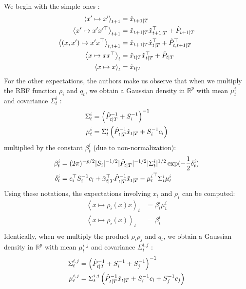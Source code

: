 We begin with the simple ones :
\begin{align*}
  \left< x' \mapsto x'\right>_{t+1} &= \hat{x}_{t+1 \mathbin{\vert} T}\\
  \left< x' \mapsto x'x'^{\top}\right>_{t+1} &= \hat{x}_{t+1 \mathbin{\vert} T}\hat{x}_{t+1 \mathbin{\vert} T}^{\top} + \hat{P}_{t+1 \mathbin{\vert} T}\\
  \left< (x,x') \mapsto x'x^{\top}\right>_{t,t+1} &= \hat{x}_{t+1 \mathbin{\vert} T} \hat{x}_{t \mathbin{\vert} T}^{\top} + \hat{P}_{t,t+1 \mathbin{\vert} T}^{\top}\\
  \left< x \mapsto xx^{\top}\right>_{t} &= \hat{x}_{t \mathbin{\vert} T} \hat{x}_{t \mathbin{\vert} T}^{\top} + \hat{P}_{t \mathbin{\vert} T}\\
  \left< x \mapsto x\right>_{t} &= \hat{x}_{t \mathbin{\vert} T}\\
\end{align*}
For the other expectations, the authors make us observe that when we multiply the RBF function $\rho_i$ and $q_t$, we obtain a Gaussian density in $\mathbb{R}^p$ with mean $\mu^i_t$ and covariance $\Sigma^i_t$ :
\begin{align*}
  \Sigma^i_t &= \left( \hat{P}_{t \mathbin{\vert} T}^{-1} + S_i^{-1} \right)^{-1}\\
  \mu^i_t &= \Sigma^i_t \left( \hat{P}_{t \mathbin{\vert} T}^{-1} \hat{x}_{t \mathbin{\vert} T} + S_i^{-1}c_i \right)\\
\end{align*}
multiplied by the constant $\beta^i_t$ (due to non-normalization):
\begin{align*}
  \beta^i_t &= (2\pi)^{-p/2} |S_i|^{-1/2} |\hat{P}_{t|T}|^{-1/2} |\Sigma^i_t|^{1/2} \exp(-\frac{1}{2} \delta^i_t)\\
  \delta^i_t &= c_i^{\top} S_i^{-1} c_i + \hat{x}_{t \mathbin{\vert} T}^{\top} \hat{P}_{t \mathbin{\vert} T}^{-1} \hat{x}_{t \mathbin{\vert} T} - {\mu^i_t}^{\top} \Sigma^i_t \mu^i_t\\
\end{align*}
Using these notations, the expectations involving $x_t$ and $\rho_i$ can be computed:
\begin{align*}
  \left< x \mapsto \rho_i(x) x \right>_{t} &= \beta^i_t \mu^i_t\\
  \left< x \mapsto \rho_i(x) \right>_{t} &= \beta^i_t\\
\end{align*}
Identically, when we multiply the product $\rho_i \rho_j$ and $q_t$, we obtain a Gaussian density in $\mathbb{R}^p$ with mean $\mu^{i,j}_t$ and covariance $\Sigma^{i,j}_t$ :
\begin{align*}
  \Sigma^{i,j}_t &= \left( \hat{P}_{t \mathbin{\vert} T}^{-1} + S_i^{-1} + S_j^{-1} \right)^{-1}\\
  \mu^{i,j}_t &= \Sigma^{i,j}_t \left( \hat{P}_{t \mathbin{\vert} T}^{-1} \hat{x}_{t \mathbin{\vert} T} + S_i^{-1}c_i + S_j^{-1}c_j \right)\\
\end{align*}
